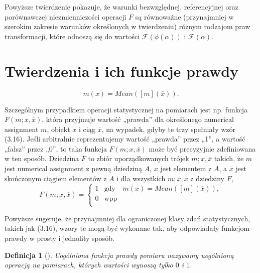 \documentclass[12pt,a4paper]{report}
\newtheorem{definition}{Definicja}[chapter]
\newcommand{\domkniecie}[1]{\left[ {#1} \right] }
\begin{document}
Powyższe twierdzenie pokazuje, że warunki bezwzględnej, referencyjnej oraz porównawczej niezmienniczości operacji $F$ są równoważne (przynajmniej w szerokim zakresie warunków określonych w twierdzeniu) różnym rodzajom praw transformacji, które odnoszą się do wartości $\mathcal{F}(\phi(\alpha))$ i $\mathcal{F}(\alpha)$. 
\section{Twierdzenia i ich funkcje prawdy}
\begin{equation}
m(x)=Mean(\domkniecie{m}(\overline{x})).
\end{equation}

Szczególnym przypadkiem operacji statystycznej na pomiarach jest np. funkcja $F(m; x, \overline{x})$, która przyjmuje wartość „prawda” dla określonego numerical assignment $m$, obiekt $x$ i ciąg $\overline{x}$, na wypadek, gdyby te trzy spełniały wzór (3.16). Jeśli arbitralnie reprezentujemy wartość „prawda” przez „1”, a wartość „fałsz” przez „0”, to taka funkcja $F(m; x, \overline{x})$ może być precyzyjnie zdefiniowana w ten sposób. Dziedzina $F$ to zbiór uporządkowanych trójek $m; x, \overline{x}$ takich, że $m$ jest numerical assignment z pewną dziedziną $A$, $x$ jest elementem z $A$, a $\overline{x}$ jest skończonym ciągiem elementów z $A$ i dla wszystkich $m; x, \overline{x}$ z dziedziny $F$,
\begin{equation}
F(m;x,\overline{x})= \left\{ \begin{array}{lcl}
1 & \textrm{gdy} & m(x)=Mean(\domkniecie{m}(\overline{x})),\\
0 & \textrm{wpp}\\
\end{array} \right.
\end{equation}

Powyższe sugeruje, że przynajmniej dla ograniczonej klasy zdań statystycznych, takich jak (3.16), wzory te mogą być wykonane tak, aby odpowiadały funkcjom prawdy w prosty i jednolity sposób.
\begin{definition}[{\citep[Def. 6]{adams1965theory}}]
Uogólniona funkcja prawdy pomiaru nazywamy uogólnioną operacją na pomiarach, których wartości wynoszą tylko $0$ i $1$.
\end{definition}
\end{document}
